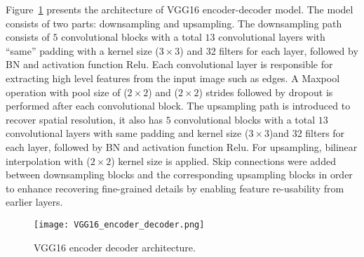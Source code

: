 Figure~\ref{vgg16} presents the architecture of VGG16 encoder-decoder model. 
The model consists of two parts: downsampling and upsampling.
The downsampling path consists of \(5\) convolutional blocks with a total \(13\) convolutional layers  with \enquote{same} padding with a kernel size (\(3\times3\)) and 32 filters for each layer, followed by BN and activation function Relu.
Each convolutional layer is responsible for extracting high level features from the input image such as edges.
A Maxpool operation with pool size of (\(2\times2\))  and (\(2\times2\)) strides followed by dropout is performed after each convolutional block. 
The upsampling path is introduced to recover spatial resolution, it also has \(5\) convolutional blocks with a total \(13\) convolutional layers  with same padding and kernel size (\(3\times3\))and 32 filters for each layer, followed by BN and activation function Relu.
For upsampling, bilinear interpolation with (\(2\times2\)) kernel size is applied.
Skip connections were added between downsampling blocks and the corresponding upsampling blocks in order to enhance recovering fine-grained details by enabling feature re-usability from earlier layers.
\begin{figure} [h!]
	\begin{center}
		\texttt{[image: VGG16\_encoder\_decoder.png]}
	\end{center}
	\caption{VGG16 encoder decoder architecture.} 
	\label{vgg16}
\end{figure}



